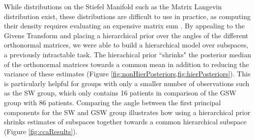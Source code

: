 \documentclass{article}
\begin{document}
While distributions on the Stiefel Manifold such as the Matrix Langevin distribution \citep{muirhead2009aspects} exist, these distributions are difficult to use in practice, as computing their density requires evaluating an expensive matrix sum \citep{hoff2009simulation}. By appealing to the Givens Transform and placing a hierarchical prior over the angles of the different orthonormal matrices, we were able to build a hierarchical model over subspaces, a previously intractable task. The hierachical prior ``shrinks" the posterior median of the orthonormal matrices towards a common mean in addition to reducing the variance of these estimates (Figure \ref{fig:nonHierPosteriors,fig:hierPosteriors}). This is particularly helpful for groups with only a smaller number of observations such as the SW group, which only contains 16 patients in comparison of the GSW group with 86 patients. Comparing the angle between the first principal components for the SW and GSW group illustrates how using a hierarchical prior shrinks estimates of subspaces together towards a common hierarchical subspace (Figure \ref{fig:ccaResults}).
\end{document}
